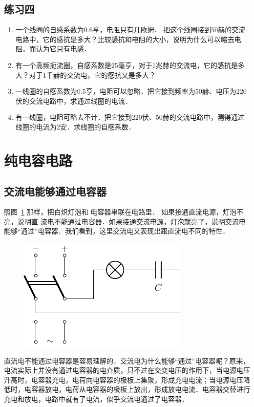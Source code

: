 \subsection*{练习四}
\begin{enumerate}
    \item 一个线圈的自感系数为0.6亨，电阻只有几欧姆．
    把这个线圈接到50赫的交流电路中，它的感抗是多大？比较感抗和电阻的大小，说明为什么可以略去电阻，而认为它只有电感．
    \item 有一个高频扼流圈，自感系数是25毫亨，对于1兆赫的交流电，它的感抗是多大？对于1千赫的交流电，它的感抗又是多大？
    \item 一线圈的自感系数为0.5亨，电阻可以忽略．把它接到频率为50赫、电压为220伏的交流电路中，求通过线圈的电流．
    \item 有一线圈，电阻可略去不计．把它接到220伏、50赫的交流电路中，测得通过线圈的电流为2安．求线圈的自感系数．
\end{enumerate}
	
\section{纯电容电路}
\subsection{交流电能够通过电容器}

照图~\ref{fig_C_3-17} 那样，把白炽灯泡和
电容器串联在电路里．
如果接通直流电源，灯泡不亮，说明直
流电不能通过电容器．如果接通交流电源，灯泡就亮了，说明交流电能够“通过”电容器．我们看到，这里交流电又表现出跟直流电不同的特性．
\begin{figure}[htbp]
    \centering
    \includegraphics{fig/C/3-17.pdf}
    \caption{}\label{fig_C_3-17}
\end{figure}

直流电不能通过电容器是容易理解的．交流电为什么能够“通过”电容器呢？原来，电流实际上并没有通过电容器的电介质，只不过在交变电压的作用下，当电源电压升高时，电容器充电，电荷向电容器的极板上集聚，形成充电电流；当电源电压降低时，电容器放电，电荷从电容器的极板上放出，形成放电电流．电容器交替进行充电和放电，电路中就有了电流，似乎交流电通过了电容器．

